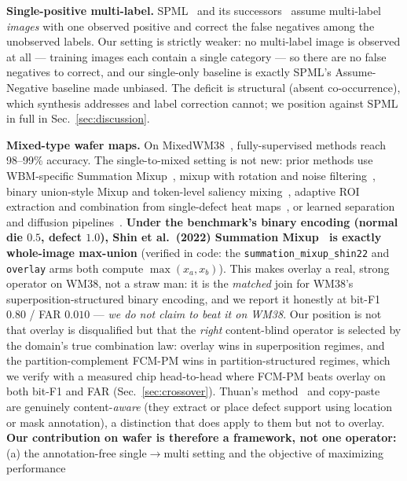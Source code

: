 \documentclass[11pt]{article}
\begin{document}
\textbf{Single-positive multi-label.} SPML~\cite{cole2021spml} and its
successors~\cite{kim2022largeloss} assume multi-label \emph{images} with one
observed positive and correct the false negatives among the unobserved
labels. Our setting is strictly weaker: no multi-label image is observed at
all --- training images each contain a single category --- so there are no
false negatives to correct, and our single-only baseline is exactly SPML's
Assume-Negative baseline made unbiased. The deficit is structural (absent
co-occurrence), which synthesis addresses and label correction cannot; we
position against SPML in full in Sec.~\ref{sec:discussion}.

\textbf{Mixed-type wafer maps.} On
MixedWM38~\cite{wang2020mixedwm38}, fully-supervised methods reach
98--99\% accuracy. The single-to-mixed setting is not new: prior methods use
WBM-specific Summation Mixup~\cite{shin2022summation}, mixup with rotation and
noise filtering~\cite{eswa2023singletomixed}, binary union-style Mixup and
token-level saliency mixing~\cite{yu2024unionmixup}, adaptive ROI extraction
and combination from single-defect heat maps~\cite{thuan2025adaptive}, or
learned separation and diffusion
pipelines~\cite{li2025separation,yang2026diffusion}. \textbf{Under the benchmark's
binary encoding (normal die $0.5$, defect $1.0$), Shin et al.\ (2022) Summation
Mixup~\cite{shin2022summation} is exactly whole-image max-union} (verified in code:
the \texttt{summation\_mixup\_shin22} and \texttt{overlay} arms both compute
$\max(x_a,x_b)$). This makes overlay a real, strong operator on WM38, not a straw man:
it is the \emph{matched} join for WM38's superposition-structured binary encoding, and
we report it honestly at bit-F1 $0.80$ / FAR $0.010$ --- \emph{we do not claim to beat
it on WM38}. Our position is not that overlay is disqualified but that the \emph{right}
content-blind operator is selected by the domain's true combination law: overlay wins
in superposition regimes, and the partition-complement FCM-PM wins in
partition-structured regimes, which we verify with a measured chip head-to-head where
FCM-PM beats overlay on both bit-F1 and FAR (Sec.~\ref{sec:crossover}). Thuan's
method~\cite{thuan2025adaptive} and copy-paste~\cite{ghiasi2021copypaste} are
genuinely content-\emph{aware} (they extract or place defect support using location or
mask annotation), a distinction that does apply to them but not to overlay. \textbf{Our
contribution on wafer is therefore a framework, not one operator:} (a) the
annotation-free single$\to$multi setting and the objective of maximizing performance
\end{document}

